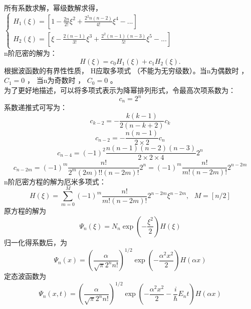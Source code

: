 所有系数求解，幂级数解求得，\\
	$\displaystyle \begin{cases}
		H_1(\xi)  = [1- \frac{2n}{2!} \xi^2+ \frac{2^2n(n-2)}{4!} \xi^4 -...  ] \\
		H_2(\xi)  = [\xi- \frac{2(n-1)}{3!} \xi^3+ \frac{2^2(n-1)(n-3) }{5!}\xi^5 -...  ]
	\end{cases}$ \\
n阶厄密的解为：
	\begin{equation*}
		H(\xi) =c_0H_1(\xi)+c_1 H_2(\xi).
	\end{equation*}   
	根据波函数的有界性性质， H应取多项式 （不能为无穷级数）。当n为偶数时 ， $C_1=0$ ， 当n为奇数时 ， $C_0=0$  。\\
	为了更好地描述，可以将多项式表示为降幂排列形式，令最高次项系数为：
	\begin{equation*}
		c_n =2^n
	\end{equation*}  
	系数递推式可写为：
	\begin{equation*}
		c_{k-2} = -\frac{k(k-1) } { 2(n-k+2)}  c_k
	\end{equation*} 
	\begin{equation*}
		c_{n-2} = -\frac{n(n-1) } { 2\times2}  c_n
	\end{equation*} 
	\begin{equation*}
		c_{n-4} = (-1)^2 \frac{n(n-1)(n-2) (n-3) } { 2\times2\times 4}  2^n
	\end{equation*} 
	\begin{equation*}
		c_{n-2m} = (-1)^m \frac{n! } { 2^m (2m) !! (n-2m)!}  2^n =(-1)^m \frac{n! } {  m ! (n-2m)!}  2^{n-2m} 
	\end{equation*} 
n阶厄密方程的解为厄米多项式：
\begin{equation*}
	H(\xi) =\sum_{m=0}^{M}  (-1)^m \frac{n! } {  m ! (n-2m)!}  2^{n-2m} \xi^{n-2m} ,  ~~~ M=[n/2]
\end{equation*}   
原方程的解为
 \begin{equation*}
 	\Psi_n(\xi) = N_n \exp(-\frac{\xi ^2}{2}) H(\xi) 
 \end{equation*}   
归一化得系数后，为
\begin{equation*}
	\Psi_n(x) = \left( \frac{\alpha}{\sqrt{\pi} 2^n n!}  \right) ^{1/2}  \exp(-\frac{ \alpha^2 x^2}{2}) H( \alpha x) 
\end{equation*}  
定态波函数为
\begin{equation*}
	\Psi_n(x,t) = \left( \frac{\alpha}{\sqrt{\pi} 2^n n!}  \right) ^{1/2}  \exp(-\frac{ \alpha^2 x^2}{2} -\frac{i}{\hbar} E_n t ) H( \alpha x) 
\end{equation*}  


